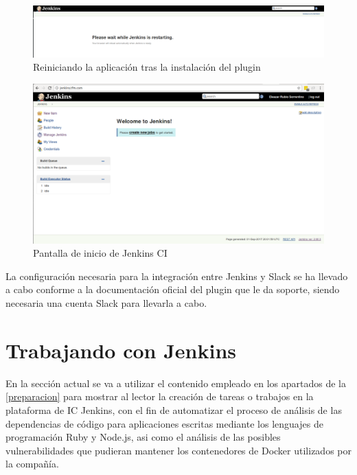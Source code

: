 \begin{figure}[H]
	\centering
	\includegraphics[width=1.0\linewidth]
	{desarrollo/figuras/jenkins_09.png}
	\caption{Reiniciando la aplicación tras la instalación del plugin}
	\label{jenkins_09}
\end{figure}

\begin{figure}[htbp]
	\centering
	\includegraphics[width=1.0\linewidth]
	{desarrollo/figuras/jenkins_10.png}
	\caption{Pantalla de inicio de Jenkins \gls{CI}}
	\label{jenkins_10}
\end{figure}

La configuración necesaria para la integración entre Jenkins y Slack se ha llevado a cabo conforme a la documentación oficial del plugin que le da soporte\cite{slackplugin2017}, siendo necesaria una cuenta Slack para llevarla a cabo. 

\section{Trabajando con Jenkins}\label{trabajando_jenkins}

En la sección actual se va a utilizar el contenido empleado en los apartados de la \autoref{preparacion} para mostrar al lector la creación de tareas o trabajos en la plataforma de \gls{IC} Jenkins, con el fin de automatizar el proceso de análisis de las dependencias de código para aplicaciones escritas mediante los lenguajes de programación Ruby y Node.js, asi como el análisis de las posibles vulnerabilidades que pudieran mantener los contenedores de Docker utilizados por la compañía.

